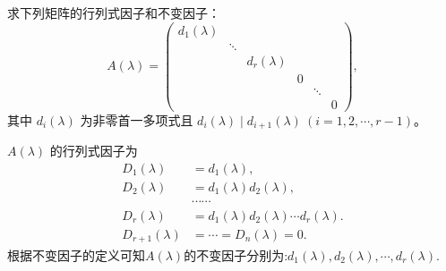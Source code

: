\documentclass[../../main.tex]{subfiles}%
\begin{document}
\begin{proposition}\label{proposition:相抵标准型的行列式因子和不变因子}
求下列矩阵的行列式因子和不变因子：
\[
A(\lambda)=\begin{pmatrix}
d_1(\lambda) & & & & \\
& \ddots & & & \\
& & d_r(\lambda) & & \\
& & & 0 & \\
& & & & \ddots & \\
& & & & & 0
\end{pmatrix},
\]
其中 $d_i(\lambda)$ 为非零首一多项式且 $d_i(\lambda)\mid d_{i + 1}(\lambda)\ (i = 1, 2, \cdots, r - 1)$。
\end{proposition}
\begin{solution}
$A(\lambda)$ 的行列式因子为
\begin{align*}
D_1(\lambda)&=d_1(\lambda),\\
D_2(\lambda)&=d_1(\lambda)d_2(\lambda),\\
&\cdots\cdots\\
D_r(\lambda)&=d_1(\lambda)d_2(\lambda)\cdots d_r(\lambda).
\\
D_{r+1}(\lambda)&=\cdots=D_n(\lambda)=0.
\end{align*}
根据不变因子的定义可知$A(\lambda)$的不变因子分别为:$d_1(\lambda),d_2(\lambda),\cdots,d_r(\lambda).$

\end{solution}
\end{document}
